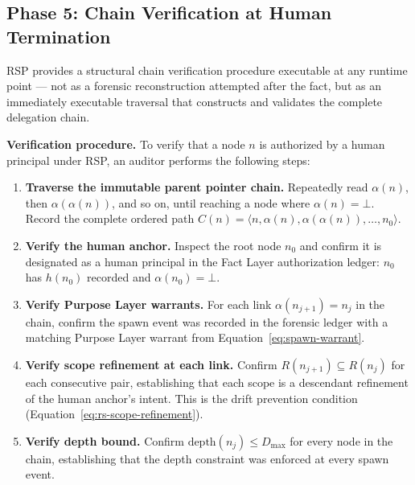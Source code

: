 \subsection{Phase 5: Chain Verification at Human Termination}
\label{sec:rs-phase5}

RSP provides a structural chain verification procedure executable at any runtime point — not as a forensic reconstruction attempted after the fact, but as an immediately executable traversal that constructs and validates the complete delegation chain.

\medskip
\noindent\textbf{Verification procedure.} To verify that a node $n$ is authorized by a human principal under RSP, an auditor performs the following steps:

\begin{enumerate}
    \item[(V1)] \textbf{Traverse the immutable parent pointer chain.} Repeatedly read $\alpha(n)$, then $\alpha(\alpha(n))$, and so on, until reaching a node where $\alpha(n) = \bot$. Record the complete ordered path $C(n) = \langle n, \alpha(n), \alpha(\alpha(n)), \ldots, n_0 \rangle$.

    \item[(V2)] \textbf{Verify the human anchor.} Inspect the root node $n_0$ and confirm it is designated as a human principal in the Fact Layer authorization ledger: $n_0$ has $h(n_0)$ recorded and $\alpha(n_0) = \bot$.

    \item[(V3)] \textbf{Verify Purpose Layer warrants.} For each link $\alpha(n_{j+1}) = n_j$ in the chain, confirm the spawn event was recorded in the forensic ledger with a matching Purpose Layer warrant from Equation~\ref{eq:spawn-warrant}.

    \item[(V4)] \textbf{Verify scope refinement at each link.} Confirm $R(n_{j+1}) \subseteq R(n_j)$ for each consecutive pair, establishing that each scope is a descendant refinement of the human anchor's intent. This is the drift prevention condition (Equation~\ref{eq:rs-scope-refinement}).

    \item[(V5)] \textbf{Verify depth bound.} Confirm $\text{depth}(n_j) \leq D_{\max}$ for every node in the chain, establishing that the depth constraint was enforced at every spawn event.
\end{enumerate}

